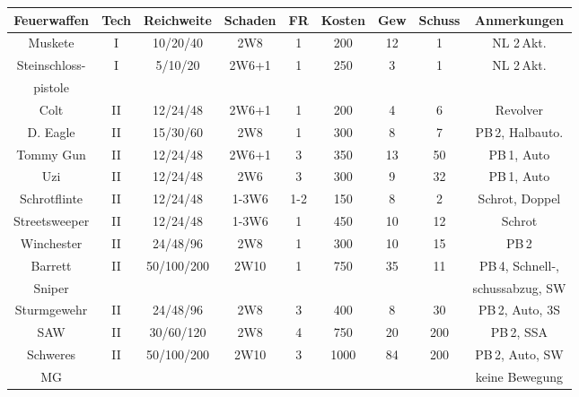 \documentclass[10pt,a4paper]{report}
\begin{document}
\begin{table}
\begin{tabular}{|c|c|c|c|c|c|c|c|c|}
\hline 
\textbf{Feuerwaffen} & Tech & Reichweite & Schaden & FR & Kosten & Gew & Schuss & Anmerkungen \\ 
\hline 
Muskete 	& I & 10/20/40 & 2W8 & 1 & 200 & 12 & 1 & NL 2\,Akt. \\ 
\hline 
Steinschloss- & I & 5/10/20 & 2W6+1 & 1 & 250 & 3 & 1 & NL 2\,Akt. \\ 
pistole & & & & & & & & \\
\hline 
Colt 	& II & 12/24/48 & 2W6+1 & 1 & 200 & 4 & 6 & Revolver \\ 
\hline 
D. Eagle 	& II & 15/30/60 & 2W8 & 1 & 300 & 8 & 7 & PB\,2, Halbauto. \\ 
\hline 
Tommy Gun 	& II & 12/24/48 & 2W6+1 & 3 & 350 & 13 & 50 & PB\,1, Auto \\ 
\hline 
Uzi 	& II & 12/24/48 & 2W6 & 3 & 300 & 9 & 32 & PB\,1, Auto \\ 
\hline 
Schrotflinte	& II & 12/24/48 & 1-3W6 & 1-2 & 150 & 8 & 2 & Schrot, Doppel \\ 
\hline 
Streetsweeper& II & 12/24/48 & 1-3W6 & 1 & 450 & 10 & 12 & Schrot \\ 
\hline
Winchester 	& II & 24/48/96 & 2W8 & 1 & 300 & 10 & 15 & PB\,2 \\ 
\hline 
Barrett 	& II & 50/100/200 & 2W10 & 1 & 750 & 35 & 11 & PB\,4, Schnell-,\\ 
Sniper & & & & & & & & schussabzug, SW\\
\hline
Sturmgewehr 	& II & 24/48/96 & 2W8 & 3 & 400 & 8 & 30 & PB\,2, Auto, 3S \\ 
\hline
SAW 	& II & 30/60/120 & 2W8 & 4 & 750 & 20 & 200 & PB\,2, SSA \\ 
\hline
Schweres & II & 50/100/200 & 2W10 & 3 & 1000 & 84 & 200 &  PB\,2, Auto, SW\\ 
MG & & & & & & & & keine Bewegung\\
\hline
\end{tabular}
\end{table}
\end{document}
